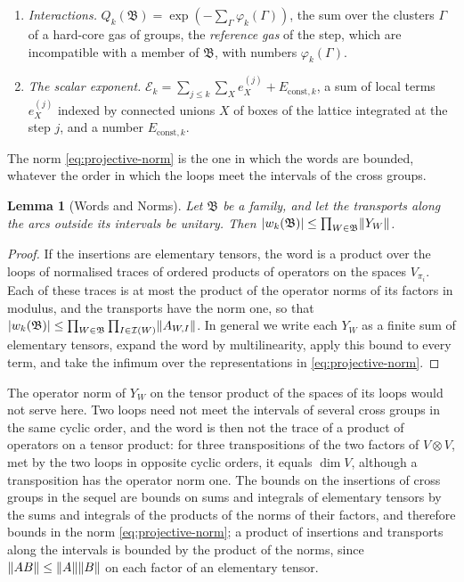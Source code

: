\documentclass[11pt]{preprint}
\DeclarePairedDelimiter{\abs}{\lvert}{\rvert}
\DeclarePairedDelimiter{\norm}{\lVert}{\rVert}
\numberwithin{equation}{section}
\newtheorem{lemma}[theorem]{Lemma}
\theoremstyle{definition}
\theoremstyle{remark}
\theoremstyle{plain}
\begin{document}
\begin{enumerate}[label=(\alph*)]
\item \emph{Interactions.} $Q_k(\mathfrak B) = \exp(-\sum_{\Gamma}\varphi_k(\Gamma))$, the sum over the clusters $\Gamma$ of a hard-core gas of groups, the \emph{reference gas} of the step, which are incompatible with a member of $\mathfrak B$, with numbers $\varphi_k(\Gamma)$.
\item \emph{The scalar exponent.} $\mathcal E_k = \sum_{j \leq k}\sum_Xe^{(j)}_X + E_{\mathrm{const},k}$, a sum of local terms $e^{(j)}_X$ indexed by connected unions $X$ of boxes of the lattice integrated at the step $j$, and a number $E_{\mathrm{const},k}$.
\end{enumerate}

The norm \eqref{eq:projective-norm} is the one in which the words are bounded, whatever the order in which the loops meet the intervals of the cross groups.

\begin{lemma}[Words and Norms]\label{lem:word-norm}
Let $\mathfrak B$ be a family, and let the transports along the arcs outside its intervals be unitary. Then $\abs{w_k(\mathfrak B)} \leq \prod_{W \in \mathfrak B}\norm{Y_W}$.
\end{lemma}

\begin{proof}
If the insertions are elementary tensors, the word is a product over the loops of normalised traces of ordered products of operators on the spaces $V_{\pi_i}$. Each of these traces is at most the product of the operator norms of its factors in modulus, and the transports have the norm one, so that $\abs{w_k(\mathfrak B)} \leq \prod_{W \in \mathfrak B}\prod_{I \in \mathcal I(W)}\norm{A_{W,I}}$. In general we write each $Y_W$ as a finite sum of elementary tensors, expand the word by multilinearity, apply this bound to every term, and take the infimum over the representations in \eqref{eq:projective-norm}.
\end{proof}

The operator norm of $Y_W$ on the tensor product of the spaces of its loops would not serve here. Two loops need not meet the intervals of several cross groups in the same cyclic order, and the word is then not the trace of a product of operators on a tensor product: for three transpositions of the two factors of $V \otimes V$, met by the two loops in opposite cyclic orders, it equals $\dim V$, although a transposition has the operator norm one. The bounds on the insertions of cross groups in the sequel are bounds on sums and integrals of elementary tensors by the sums and integrals of the products of the norms of their factors, and therefore bounds in the norm \eqref{eq:projective-norm}; a product of insertions and transports along the intervals is bounded by the product of the norms, since $\norm{AB} \leq \norm{A}\norm{B}$ on each factor of an elementary tensor.
\end{document}
